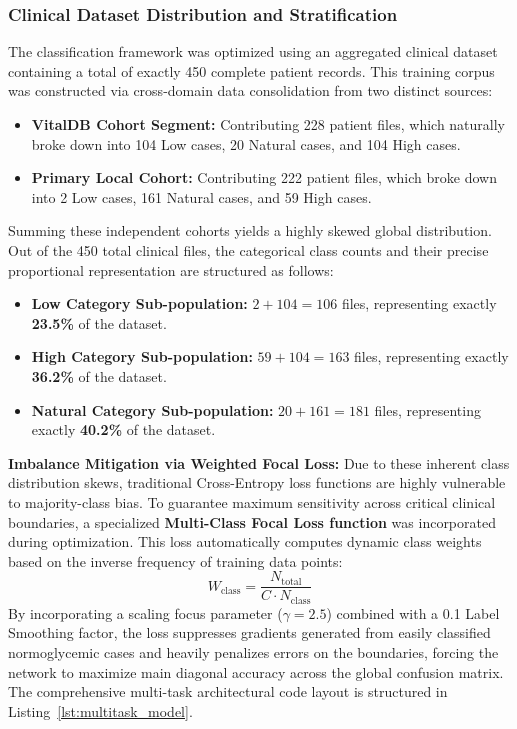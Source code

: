 \subsubsection{Clinical Dataset Distribution and Stratification}
The classification framework was optimized using an aggregated clinical dataset containing a total of exactly 450 complete patient records. This training corpus was constructed via cross-domain data consolidation from two distinct sources:
\begin{itemize}
    \item \textbf{VitalDB Cohort Segment:} Contributing 228 patient files, which naturally broke down into 104 Low cases, 20 Natural cases, and 104 High cases.
    \item \textbf{Primary Local Cohort:} Contributing 222 patient files, which broke down into 2 Low cases, 161 Natural cases, and 59 High cases.
\end{itemize}

Summing these independent cohorts yields a highly skewed global distribution. Out of the 450 total clinical files, the categorical class counts and their precise proportional representation are structured as follows:
\begin{itemize}
    \item \textbf{Low Category Sub-population:} $2 + 104 = 106$ files, representing exactly \textbf{23.5\%} of the dataset.
    \item \textbf{High Category Sub-population:} $59 + 104 = 163$ files, representing exactly \textbf{36.2\%} of the dataset.
    \item \textbf{Natural Category Sub-population:} $20 + 161 = 181$ files, representing exactly \textbf{40.2\%} of the dataset.
\end{itemize}

\textbf{Imbalance Mitigation via Weighted Focal Loss:} Due to these inherent class distribution skews, traditional Cross-Entropy loss functions are highly vulnerable to majority-class bias. To guarantee maximum sensitivity across critical clinical boundaries, a specialized \textbf{Multi-Class Focal Loss function} was incorporated during optimization. This loss automatically computes dynamic class weights based on the inverse frequency of training data points:
\begin{equation}
W_{\text{class}} = \frac{N_{\text{total}}}{C \cdot N_{\text{class}}}
\end{equation}
By incorporating a scaling focus parameter ($\gamma = 2.5$) combined with a 0.1 Label Smoothing factor, the loss suppresses gradients generated from easily classified normoglycemic cases and heavily penalizes errors on the boundaries, forcing the network to maximize main diagonal accuracy across the global confusion matrix. The comprehensive multi-task architectural code layout is structured in Listing~\ref{lst:multitask_model}.

